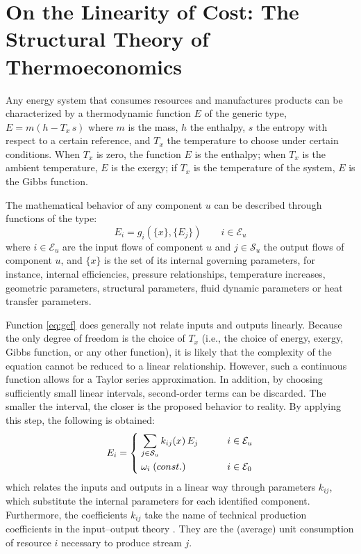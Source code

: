 \documentclass[energies,article,submit,moreauthors,pdftex]{Definitions/mdpi}
\begin{document}
\section{On the Linearity of Cost: The Structural Theory of Thermoeconomics}
Any energy system that consumes resources and manufactures products can be characterized by a thermodynamic function $E$ of the generic type, $E = m (h-T_x\,s)$ where $m$ is the mass, $h$ the enthalpy, $s$ the entropy with respect to a certain reference, and $T_x$ the temperature to choose under certain conditions. When $T_x$ is zero, the function $E$ is the enthalpy; when $T_x$ is the ambient temperature, $E$ is the exergy; if $T_x$ is the temperature of the system, $E$ is the Gibbs function.

The mathematical behavior of any component $u$ can be described through functions of the type:
\begin{equation}
    \label{eq:gcf}
    E_i=g_i\left(\{x\},\{E_j\}\right) \qquad i\in\mathcal{E}_u
\end{equation}
where $i\in\mathcal{E}_u$ are the input flows of component $u$ and $j\in\mathcal{S}_u$ the output flows of component $u$, and $\{x\}$ is the set of its internal governing parameters, for instance, internal efficiencies, pressure relationships, temperature increases, geometric parameters, structural parameters, fluid dynamic parameters or heat transfer parameters.

Function \cref{eq:gcf} does generally not relate inputs and outputs linearly. Because the only degree of freedom is the choice of $T_x$ (i.e., the choice of energy, exergy, Gibbs function, or any other function), it is likely that the complexity of the equation cannot be reduced to a linear relationship.
However, such a continuous function allows for a Taylor series approximation. In addition, by choosing sufficiently small linear intervals, second-order terms can be discarded. The smaller the interval, the closer is the proposed behavior to reality. By applying this step, the following is obtained:
\begin{equation}
    E_i=\begin{dcases}
    \;\sum\limits_{j\in\mathcal{S}_u}{k_{ij}(x)\,E_j} \qquad &i\in\mathcal{E}_u \\
    \;\omega_i\;\text(const.) \qquad &i\in\mathcal{E}_0
    \end{dcases}
    \label{eq:echar}
\end{equation}
which relates the inputs and outputs in a linear way through parameters $k_{ij}$, which substitute the internal parameters for each identified component. Furthermore, the coefficients $k_{ij}$ take the name of technical production coefficients in the input–output theory \cite{Leontief1970}. They are the (average) unit consumption of resource $i$ necessary to produce stream $j$.
\end{document}
